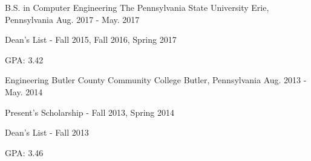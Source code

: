 

\begin{cventries}

  \cventry
    {B.S. in Computer Engineering} %
    {The Pennsylvania State University} %
    {Erie, Pennsylvania} %
    {Aug. 2017 - May. 2017} %
    {
      \begin{cvitems} %
        \item {Dean's List - Fall 2015, Fall 2016, Spring 2017}
        \item {GPA: 3.42}
      \end{cvitems}
    }

  \cventry
    {Engineering} %
    {Butler County Community College} %
    {Butler, Pennsylvania} %
    {Aug. 2013 - May. 2014} %
    {
      \begin{cvitems} %
        \item {Present's Scholarship - Fall 2013, Spring 2014}
        \item {Dean's List - Fall 2013}
        \item {GPA: 3.46}
      \end{cvitems}
    }

\end{cventries}
